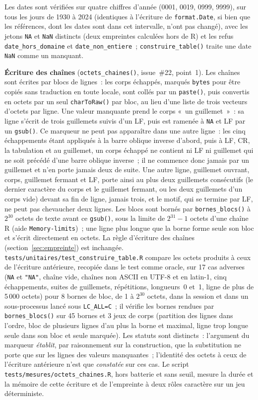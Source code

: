 \documentclass[a4paper,11pt]{article}
\newcommand{\code}[1]{\texttt{\small #1}}
\begin{document}
\medskip
Les dates sont vérifiées sur quatre chiffres
d'année (0001, 0019, 0999, 9999), sur tous les jours de 1930 à 2024
(identiques à l'écriture de \code{format.Date}, si bien que les références,
dont les dates sont dans cet intervalle, n'ont pas changé), avec les jetons
\code{NA} et \code{NaN} distincts (deux empreintes calculées hors de R) et
les refus \code{date\_hors\_domaine} et \code{date\_non\_entiere}~;
\code{construire\_table()} traite une date \code{NaN} comme un manquant.

\medskip
\textbf{Écriture des chaînes} (\code{octets\_chaines()}, issue~\#22,
point~1). Les chaînes sont écrites par blocs de lignes~: les corps échappés,
marqués \code{bytes} pour être copiés sans traduction en toute locale, sont
collés par un \code{paste()}, puis convertis en octets par un seul
\code{charToRaw()} par bloc, au lieu d'une liste de trois vecteurs d'octets
par ligne. Une valeur manquante prend le corps «~un guillemet~»~: sa ligne
s'écrit de trois guillemets suivis d'un LF, puis est ramenée à \code{NA} et
LF par un \code{gsub()}. Ce marqueur ne peut pas apparaître dans une autre
ligne~: les cinq échappements étant appliqués à la barre oblique inverse
d'abord, puis à LF, CR, la tabulation et au guillemet, un corps
échappé ne contient ni LF ni guillemet qui ne soit précédé d'une barre
oblique inverse~; il ne commence donc jamais par un guillemet et n'en porte
jamais deux de suite. Une autre ligne, guillemet ouvrant, corps, guillemet
fermant et LF, porte ainsi au plus deux guillemets consécutifs (le dernier
caractère du corps et le guillemet fermant, ou les deux guillemets d'un corps
vide) devant sa fin de ligne, jamais trois, et le motif, qui se termine par
LF, ne peut pas chevaucher deux lignes. Les blocs sont bornés par \code{bornes\_blocs()}
à $2^{30}$ octets de texte avant ce \code{gsub()}, sous la limite de
$2^{31} - 1$ octets d'une chaîne R (aide \code{Memory-limits})~; une ligne
plus longue que la borne forme seule son bloc et s'écrit directement en
octets. La règle d'écriture des chaînes (section~\ref{sec:empreinte}) est
inchangée. \code{tests/unitaires/test\_construire\_table.R} compare les
octets produits à ceux de l'écriture antérieure, recopiée dans le test comme
oracle, sur 17 cas adverses (\code{NA} et \code{"NA"}, chaîne vide, chaînes
non ASCII en UTF-8 et en latin-1, cinq échappements, suites de guillemets,
répétitions, longueurs~0 et~1, ligne de plus de 5\,000 octets) pour 8 bornes
de bloc, de 1 à $2^{30}$ octets, dans la session et dans un sous-processus
lancé sous \code{LC\_ALL=C}~; il vérifie les bornes rendues par
\code{bornes\_blocs()} sur 45 bornes et 3 jeux de corps (partition des
lignes dans l'ordre, bloc de plusieurs lignes d'au plus la borne et maximal,
ligne trop longue seule dans son bloc et seule marquée). Les statuts
sont distincts~: l'argument du marqueur \emph{établit}, par raisonnement sur
la construction, que la substitution ne porte que sur les lignes des valeurs
manquantes~; l'identité des octets à ceux de l'écriture antérieure n'est que
\emph{constatée} sur ces cas. Le script \code{tests/mesures/octets\_chaines.R}, hors
batterie et sans seuil, mesure la durée et la mémoire de cette écriture et
de l'empreinte à deux rôles caractère sur un jeu déterministe.
\end{document}

